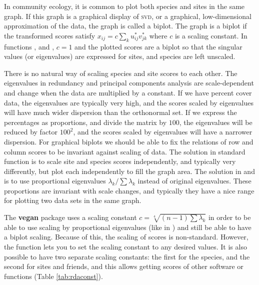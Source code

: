 \documentclass[a4paper,10pt,twocolumn]{article}
\begin{document}
In community ecology, it is common to plot both species and sites in
the same graph.  If this graph is a graphical display of \textsc{svd},
or a graphical, low-dimensional approximation of the data, the graph
is called a biplot.  The graph is a biplot if the transformed scores
satisfy $x_{ij} = c \sum_k u_{ij}^* v_{jk}^*$ where $c$ is a scaling
constant.  In functions ,  and
, $c=1$ and the plotted scores are a biplot so that the
singular values (or eigenvalues) are expressed for sites, and species
are left unscaled.  

There is no natural way of scaling species and site scores to each
other.  The eigenvalues in redundancy and principal components
analysis are scale-dependent and change when the  data are
multiplied by a constant.  If we have percent cover data, the
eigenvalues are typically very high, and the scores scaled by
eigenvalues will have much wider dispersion than the orthonormal set.
If we express the percentages as proportions, and divide the matrix by
$100$, the eigenvalues will be reduced by factor $100^2$, and the
scores scaled by eigenvalues will have a narrower dispersion.  For
graphical biplots we should be able to fix the relations of row and
column scores to be invariant against scaling of data.  The solution
in  standard function  is to scale site and species
scores independently, and typically very differently, but plot each
independently to fill the graph area.  The solution in  and 
 is to use proportional eigenvalues $\lambda_k / \sum
\lambda_k$ instead of original eigenvalues.  These proportions are
invariant with scale changes, and typically they have a nice range for
plotting two data sets in the same graph.

The \textbf{vegan} package uses a scaling constant $c = \sqrt[4]{(n-1)
  \sum \lambda_k}$ in order to be able to use scaling by proportional
eigenvalues (like in ) and still be able to have a
biplot scaling. Because of this, the scaling of  scores is
non-standard. However, the  function lets you to set
the scaling constant to any desired values. It is also possible to
have two separate scaling constants: the first for the species, and
the second for sites and friends, and this allows getting scores of
other software or  functions (Table \ref{tab:rdaconst}). 
\end{document}
